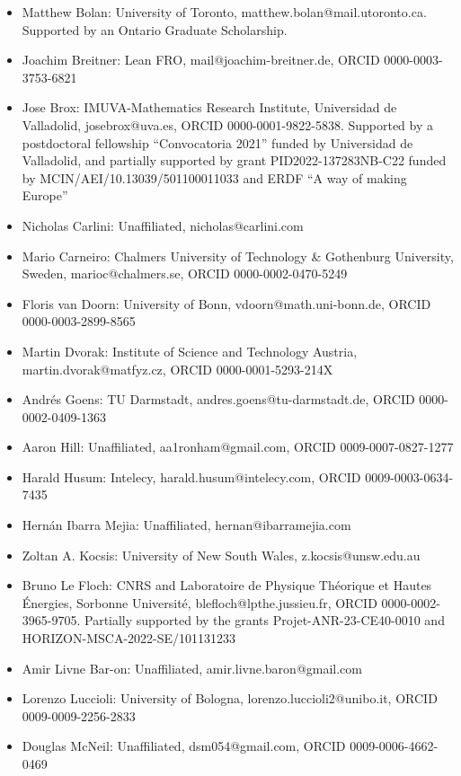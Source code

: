 \documentclass[12pt]{amsart}
\theoremstyle{definition}
\begin{document}
\begin{itemize}\raggedright
    \item Matthew Bolan: University of Toronto, matthew.bolan@mail.utoronto.ca. Supported by an Ontario Graduate Scholarship.
    \item Joachim Breitner: Lean FRO, mail@joachim-breitner.de, ORCID 0000-0003-3753-6821
    \item Jose Brox: IMUVA-Mathematics Research Institute, Universidad de Valladolid, josebrox@uva.es, ORCID 0000-0001-9822-5838. Supported by a postdoctoral fellowship “Convocatoria 2021” funded by Universidad de Valladolid, and partially supported by grant PID2022-137283NB-C22 funded by MCIN/AEI/10.13039/501100011033 and ERDF “A way of making Europe”
    \item Nicholas Carlini: Unaffiliated, nicholas@carlini.com
    \item Mario Carneiro: Chalmers University of Technology \& Gothenburg University, Sweden, marioc@chalmers.se, ORCID 0000-0002-0470-5249
    \item Floris van Doorn: University of Bonn, vdoorn@math.uni-bonn.de, ORCID 0000-0003-2899-8565
    \item Martin Dvorak: Institute of Science and Technology Austria, martin.dvorak@matfyz.cz, ORCID 0000-0001-5293-214X
    \item Andr\'es Goens: TU Darmstadt, andres.goens@tu-darmstadt.de, ORCID 0000-0002-0409-1363
    \item Aaron Hill: Unaffiliated, aa1ronham@gmail.com, ORCID 0009-0007-0827-1277
    \item Harald Husum: Intelecy, harald.husum@intelecy.com, ORCID 0009-0003-0634-7435
    \item Hern\'an Ibarra Mejia: Unaffiliated, hernan@ibarramejia.com
    \item Zoltan A. Kocsis: University of New South Wales, z.kocsis@unsw.edu.au
    \item Bruno Le Floch: CNRS and Laboratoire de Physique Th\'eorique et Hautes \'Energies, Sorbonne Universit\'e, blefloch@lpthe.jussieu.fr, ORCID 0000-0002-3965-9705. Partially supported by the grants Projet-ANR-23-CE40-0010 and HORIZON-MSCA-2022-SE/101131233
    \item Amir Livne Bar-on: Unaffiliated, amir.livne.baron@gmail.com
    \item Lorenzo Luccioli: University of Bologna, lorenzo.luccioli2@unibo.it, ORCID 0009-0009-2256-2833
    \item Douglas McNeil: Unaffiliated, dsm054@gmail.com, ORCID 0009-0006-4662-0469

\end{itemize}
\end{document}
